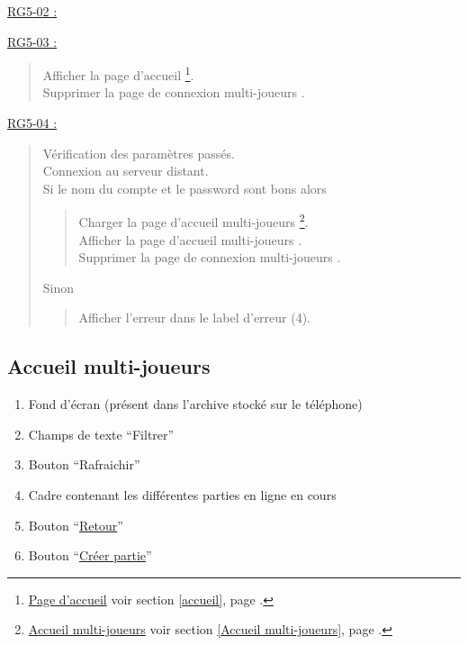 \documentclass{report}
\begin{document}
				
			\underline{RG5-02 :}
				\begin{quote}
				
				\end{quote}	

				
			\underline{RG5-03 :}
				\begin{quote}
					Afficher la page d'accueil%
						\footnote[3]{
							\hyperlink{Page d'accueil}{Page d'accueil}
							\og voir section \ref{accueil}, page \pageref{accueil}.\fg
						}.\\
					Supprimer la page de connexion multi-joueurs \footnotemark[2].\\			
				\end{quote}	
				
				
			\underline{RG5-04 :}
				\begin{quote}
					Vérification des paramètres passés.\\
					Connexion au serveur distant.\\
					Si le nom du compte et le password sont bons alors
					\begin{quote}					
						Charger la page d'accueil multi-joueurs%
							\footnote[4]{
								\hyperlink{Accueil multi-joueurs}{Accueil multi-joueurs}
								\og voir section \ref{Accueil multi-joueurs}, page \pageref{Accueil multi-joueurs}.\fg
							}.\\
						Afficher la page d'accueil multi-joueurs \footnotemark[4].\\
						Supprimer la page de connexion multi-joueurs \footnotemark[2].
					\end{quote}	
					Sinon
					\begin{quote}
						Afficher l'erreur dans le label d'erreur (4).
					\end{quote}					
				\end{quote}	

\newpage

	\subsection{Accueil multi-joueurs}

		\hypertarget{Accueil multi-joueurs}{}
		\label{Accueil multi-joueurs}

		\begin{center}
			
		\end{center}

		\begin{enumerate}
		  \item Fond d'écran (présent dans l'archive stocké sur le téléphone)
		  \item Champs de texte ``Filtrer''
		  \item Bouton ``Rafraichir''
		  \item Cadre contenant les différentes parties en ligne en cours
		  \item Bouton ``\hyperlink{Page d'accueil}{Retour}''
		  \item Bouton ``\hyperlink{Creer partie multi-joueurs}{Créer partie}''
		\end{enumerate}
\end{document}
